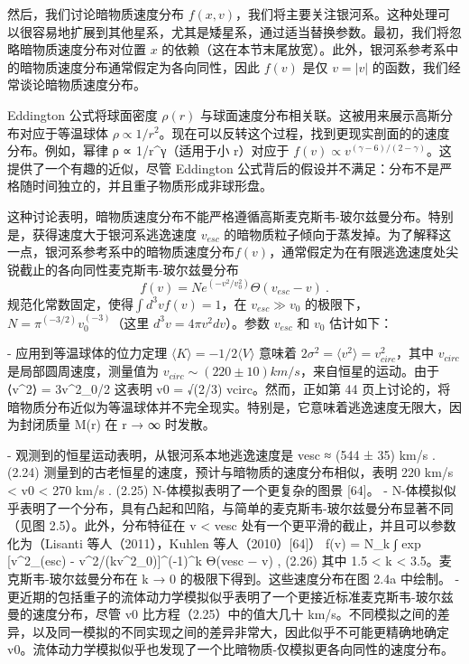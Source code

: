 

然后，我们讨论暗物质速度分布 $f(x, v)$，我们将主要关注银河系。这种处理可以很容易地扩展到其他星系，尤其是矮星系，通过适当替换参数。最初，我们将忽略暗物质速度分布对位置 $x$ 的依赖（这在本节末尾放宽）。此外，银河系参考系中的暗物质速度分布通常假定为各向同性，因此 $f(v)$ 是仅 $v = |v|$ 的函数，我们经常谈论暗物质速度分布。


Eddington 公式将球面密度 $\rho (r)$ 与球面速度分布相关联。这被用来展示高斯分布对应于等温球体 $\rho \propto 1/r^2$。现在可以反转这个过程，找到更现实剖面的的速度分布。例如，幂律 ρ ∝ 1/r^γ（适用于小 r）对应于 $f(v) \propto v^{(\gamma-6)/(2-\gamma)}$。这提供了一个有趣的近似，尽管 Eddington 公式背后的假设并不满足：分布不是严格随时间独立的，并且重子物质形成非球形盘。

这种讨论表明，暗物质速度分布不能严格遵循高斯麦克斯韦-玻尔兹曼分布。特别是，获得速度大于银河系逃逸速度 $v_{esc}$ 的暗物质粒子倾向于蒸发掉。为了解释这一点，银河系参考系中的暗物质速度分布$ f(v)$，通常假定为在有限逃逸速度处尖锐截止的各向同性麦克斯韦-玻尔兹曼分布
\begin{equation}
f(v) = N e^{(-v^2/v^2_0)} \Theta (v_{esc} - v)~.
\end{equation}
规范化常数固定，使得$ \int d^3v f(v) = 1$，在 $v_{esc} \gg v_0$ 的极限下，$N = \pi^{(-3/2)}v^{(-3)}_0$（这里 $d^3v = 4\pi v^2 dv$）。参数 $v_{esc}$ 和 $v_0$ 估计如下：

- 应用到等温球体的位力定理 $\langle K\rangle = -1/2\langle V \rangle$ 意味着 $2\sigma^2 = \langle v^2\rangle  = v^2_{circ}$，其中 $v_{circ}$ 是局部圆周速度，测量值为 $v_{circ} \sim (220 \pm 10) km/s$，来自恒星的运动。由于 ⟨v^2⟩ = 3v^2_0/2 这表明 v0 = √(2/3) vcirc。然而，正如第 44 页上讨论的，将暗物质分布近似为等温球体并不完全现实。特别是，它意味着逃逸速度无限大，因为封闭质量 M(r) 在 r → ∞ 时发散。

- 观测到的恒星运动表明，从银河系本地逃逸速度是
vesc ≈ (544 ± 35) km/s . (2.24)
测量到的古老恒星的速度，预计与暗物质的速度分布相似，表明
220 km/s < v0 < 270 km/s . (2.25)
N-体模拟表明了一个更复杂的图景 [64]。
- N-体模拟似乎表明了一个分布，具有凸起和凹陷，与简单的麦克斯韦-玻尔兹曼分布显著不同（见图 2.5）。此外，分布特征在 v < vesc 处有一个更平滑的截止，并且可以参数化为（Lisanti 等人（2011），Kuhlen 等人（2010）[64]）
f(v) = N_k
∫ exp [v^2_(esc) - v^2/(kv^2_0)]^(-1)^k Θ(vesc − v) , (2.26)
其中 1.5 < k < 3.5。麦克斯韦-玻尔兹曼分布在 k → 0 的极限下得到。这些速度分布在图 2.4a 中绘制。
- 更近期的包括重子的流体动力学模拟似乎表明了一个更接近标准麦克斯韦-玻尔兹曼的速度分布，尽管 v0 比方程（2.25）中的值大几十 km/s。不同模拟之间的差异，以及同一模拟的不同实现之间的差异非常大，因此似乎不可能更精确地确定 v0。流体动力学模拟似乎也发现了一个比暗物质-仅模拟更各向同性的速度分布。

